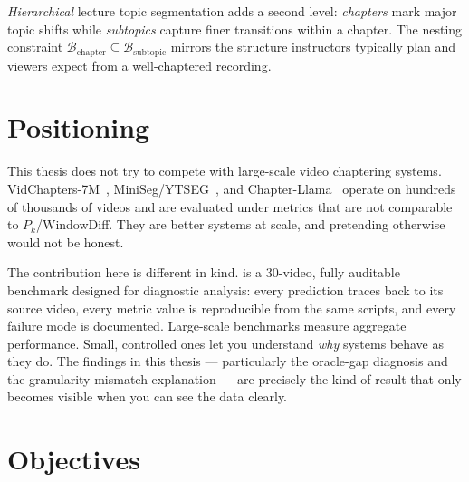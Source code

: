 \emph{Hierarchical} lecture topic segmentation adds a second level:
\emph{chapters} mark major topic shifts while \emph{subtopics} capture finer
transitions within a chapter. The nesting constraint
$\mathcal{B}_{\text{chapter}} \subseteq \mathcal{B}_{\text{subtopic}}$
mirrors the structure instructors typically plan and viewers expect from a
well-chaptered recording.

\section{Positioning}
\label{sec:positioning}

This thesis does not try to compete with large-scale video chaptering systems.
VidChapters-7M~\cite{yang2023_vidchapters},
MiniSeg/YTSEG~\cite{retkowski2024_miniseg}, and
Chapter-Llama~\cite{ventura2025_chapterllama} operate on hundreds of thousands
of videos and are evaluated under metrics that are not comparable to
$P_k$/WindowDiff. They are better systems at scale, and pretending otherwise
would not be honest.

The contribution here is different in kind. \lecseg{} is a 30-video, fully
auditable benchmark designed for diagnostic analysis: every prediction traces
back to its source video, every metric value is reproducible from the same
scripts, and every failure mode is documented. Large-scale benchmarks measure
aggregate performance. Small, controlled ones let you understand \emph{why}
systems behave as they do. The findings in this thesis --- particularly the
oracle-gap diagnosis and the granularity-mismatch explanation --- are precisely
the kind of result that only becomes visible when you can see the data clearly.

\section{Objectives}
\label{sec:rqs}

